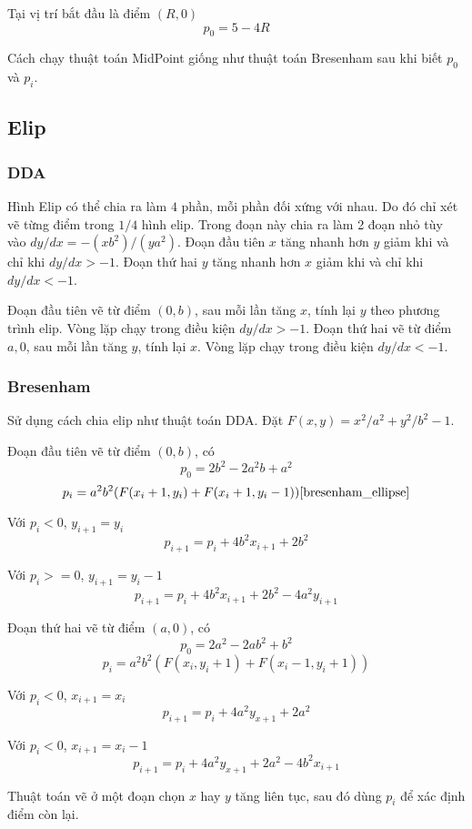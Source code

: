 \documentclass[12pt]{article}
\begin{document}
Tại vị trí bắt đầu là điểm \((R, 0)\)
\[p_0 = 5 - 4R\]

Cách chạy thuật toán MidPoint giống như thuật toán Bresenham
sau khi biết \(p_0\) và \(p_i\).

\subsection{Elip}

\subsubsection{DDA}
Hình Elip có thể chia ra làm \(4\) phần, mỗi phần đối xứng với nhau.
Do đó chỉ xét vẽ từng điểm trong \(1/4\) hình elip.
Trong đoạn này chia ra làm 2 đoạn nhỏ tùy vào \(dy/dx = -(xb^2)/(ya^2)\).
Đoạn đầu tiên \(x\) tăng nhanh hơn \(y\) giảm khi và chỉ khi \(dy/dx > -1\).
Đoạn thứ hai \(y\) tăng nhanh hơn \(x\) giảm khi và chỉ khi \(dy/dx < -1\).

Đoạn đầu tiên vẽ từ điểm \((0, b)\), sau mỗi lần tăng \(x\), tính lại \(y\) theo phương trình elip.
Vòng lặp chạy trong điều kiện \(dy/dx > -1\).
Đoạn thứ hai vẽ từ điểm \(a, 0\), sau mỗi lần tăng \(y\), tính lại \(x\).
Vòng lặp chạy trong điều kiện \(dy/dx < -1\).

\subsubsection{Bresenham}
Sử dụng cách chia elip như thuật toán DDA.
Đặt \(F(x, y) = x^2/a^2 + y^2/b^2 - 1\).

Đoạn đầu tiên vẽ từ điểm \((0, b)\), có
\[p_0 = 2b^2 - 2a^2 b + a^2\]
\[p_i = a^2 b^2 (F(x_i + 1, y_i) + F(x_i + 1, y_i - 1)) \cite{bresenham_ellipse}\]

Với \(p_i < 0\), \(y_{i+1} = y_i\)
\[p_{i+1} = p_i + 4b^2 x_{i+1} + 2b^2\]

Với \(p_i >= 0\), \(y_{i+1} = y_i - 1\)
\[p_{i+1} = p_i +  4b^2 x_{i+1} + 2b^2 - 4a^2 y_{i+1}\]

Đoạn thứ hai vẽ từ điểm \((a, 0)\), có
\[p_0 = 2a^2 - 2a b^2 + b^2\]
\[p_i = a^2 b^2 (F(x_i, y_i + 1) + F(x_i - 1, y_i + 1))\]

Với \(p_i < 0\), \(x_{i+1} = x_i\)
\[p_{i+1} = p_i + 4a^2 y_{x+1} + 2a^2\]

Với \(p_i < 0\), \(x_{i+1} = x_i - 1\)
\[p_{i+1} = p_i + 4a^2 y_{x+1} + 2a^2 - 4b^2 x_{i+1}\]

Thuật toán vẽ ở một đoạn chọn \(x\) hay \(y\) tăng liên tục,
sau đó dùng \(p_i\) để xác định điểm còn lại.
\end{document}
